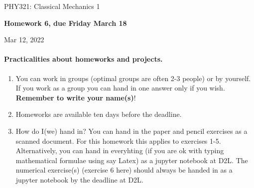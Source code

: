 \documentclass[%
oneside,                 %
final,                   %
10pt]{article}
\begin{document}

\newcommand{\exercisesection}[1]{\subsection*{#1}}






\thispagestyle{empty}

\begin{center}
{\LARGE\bf
\begin{spacing}{1.25}
PHY321: Classical Mechanics 1
\end{spacing}
}
\end{center}


\begin{center}
{\bf Homework 6, due Friday March 18${}^{}$} \\ [0mm]
\end{center}

\begin{center}
\end{center}
    

\begin{center}
Mar 12, 2022
\end{center}

\vspace{1cm}


\paragraph{Practicalities about  homeworks and projects.}
\begin{enumerate}
\item You can work in groups (optimal groups are often 2-3 people) or by yourself. If you work as a group you can hand in one answer only if you wish. \textbf{Remember to write your name(s)}!

\item Homeworks are available ten days before the deadline.

\item How do I(we)  hand in?  You can hand in the paper and pencil exercises as a scanned document. For this homework this applies to exercises 1-5. Alternatively, you can hand in everyhting (if you are ok with typing mathematical formulae using say Latex) as a jupyter notebook at D2L. The numerical exercise(s) (exercise 6 here) should always be handed in as a jupyter notebook by the deadline at D2L. 
\end{enumerate}
\end{document}

